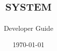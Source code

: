 \documentclass[Misc]{../../data/TelemacDoc}
\begin{document}
\let\cleardoublepage\clearpage

\title{\tel \mbox{\scshape{system}}}
\subtitle{Developer Guide}
\version{\telmaversion}
\date{\today}
\maketitle
\clearpage



\newpage

\thispagestyle{empty}

\TelemacCopyright{}




\pagestyle{empty} %

\tableofcontents %
\end{document}
